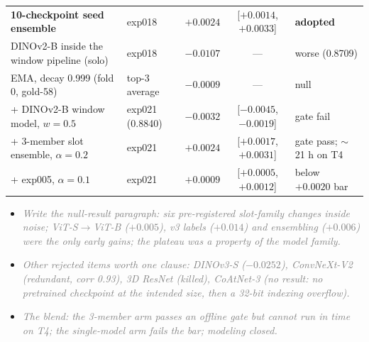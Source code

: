 \documentclass[conference]{IEEEtran}
\newcommand{\nt}[1]{\textcolor{gray}{\textit{#1}}}            %
\begin{document}
\begin{table}[t]
\begin{tabular}{@{}llccl@{}}
\textbf{10-checkpoint seed ensemble} & exp018 & $+0.0024$ & [$+0.0014$, $+0.0033$] & \textbf{adopted} \\ %
DINOv2-B inside the window pipeline (solo) & exp018 & $-0.0107$ & --- & worse (0.8709) \\ %
EMA, decay 0.999 (fold 0, gold-58) & top-3 average & $-0.0009$ & --- & null \\         %
+ DINOv2-B window model, $w=0.5$ & exp021 (0.8840) & $-0.0032$ & [$-0.0045$, $-0.0019$] & gate fail \\ %
+ 3-member slot ensemble, $\alpha=0.2$ & exp021 & $+0.0024$ & [$+0.0017$, $+0.0031$] & gate pass; $\sim$21 h on T4 \\ %
+ exp005, $\alpha=0.1$ & exp021 & $+0.0009$ & [$+0.0005$, $+0.0012$] & below $+0.0020$ bar \\ %
\bottomrule
\end{tabular}
\end{table}
\begin{notes}
\begin{itemize}
\item \nt{Write the null-result paragraph: six pre-registered slot-family changes inside noise; ViT-S$\to$ViT-B
($+0.005$), v3 labels ($+0.014$) and ensembling ($+0.006$) were the only early gains; the plateau was a property of
the model family.}  %
\item \nt{Other rejected items worth one clause: DINOv3-S ($-0.0252$), ConvNeXt-V2 (redundant, corr 0.93), 3D ResNet
(killed), CoAtNet-3 (no result: no pretrained checkpoint at the intended size, then a 32-bit indexing overflow).}
\item \nt{The blend: the 3-member arm passes an offline gate but cannot run in time on T4; the single-model arm fails the
bar; modeling closed.}  %
\end{itemize}
\end{notes}
\end{document}
